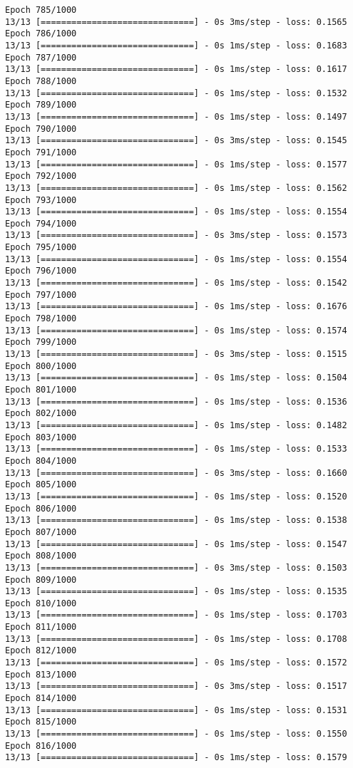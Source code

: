 \documentclass[11pt]{article}
\begin{document}
\begin{Verbatim}[commandchars=\\\{\}]
Epoch 785/1000
13/13 [==============================] - 0s 3ms/step - loss: 0.1565
Epoch 786/1000
13/13 [==============================] - 0s 1ms/step - loss: 0.1683
Epoch 787/1000
13/13 [==============================] - 0s 1ms/step - loss: 0.1617
Epoch 788/1000
13/13 [==============================] - 0s 1ms/step - loss: 0.1532
Epoch 789/1000
13/13 [==============================] - 0s 1ms/step - loss: 0.1497
Epoch 790/1000
13/13 [==============================] - 0s 3ms/step - loss: 0.1545
Epoch 791/1000
13/13 [==============================] - 0s 1ms/step - loss: 0.1577
Epoch 792/1000
13/13 [==============================] - 0s 1ms/step - loss: 0.1562
Epoch 793/1000
13/13 [==============================] - 0s 1ms/step - loss: 0.1554
Epoch 794/1000
13/13 [==============================] - 0s 3ms/step - loss: 0.1573
Epoch 795/1000
13/13 [==============================] - 0s 1ms/step - loss: 0.1554
Epoch 796/1000
13/13 [==============================] - 0s 1ms/step - loss: 0.1542
Epoch 797/1000
13/13 [==============================] - 0s 1ms/step - loss: 0.1676
Epoch 798/1000
13/13 [==============================] - 0s 1ms/step - loss: 0.1574
Epoch 799/1000
13/13 [==============================] - 0s 3ms/step - loss: 0.1515
Epoch 800/1000
13/13 [==============================] - 0s 1ms/step - loss: 0.1504
Epoch 801/1000
13/13 [==============================] - 0s 1ms/step - loss: 0.1536
Epoch 802/1000
13/13 [==============================] - 0s 1ms/step - loss: 0.1482
Epoch 803/1000
13/13 [==============================] - 0s 1ms/step - loss: 0.1533
Epoch 804/1000
13/13 [==============================] - 0s 3ms/step - loss: 0.1660
Epoch 805/1000
13/13 [==============================] - 0s 1ms/step - loss: 0.1520
Epoch 806/1000
13/13 [==============================] - 0s 1ms/step - loss: 0.1538
Epoch 807/1000
13/13 [==============================] - 0s 1ms/step - loss: 0.1547
Epoch 808/1000
13/13 [==============================] - 0s 3ms/step - loss: 0.1503
Epoch 809/1000
13/13 [==============================] - 0s 1ms/step - loss: 0.1535
Epoch 810/1000
13/13 [==============================] - 0s 1ms/step - loss: 0.1703
Epoch 811/1000
13/13 [==============================] - 0s 1ms/step - loss: 0.1708
Epoch 812/1000
13/13 [==============================] - 0s 1ms/step - loss: 0.1572
Epoch 813/1000
13/13 [==============================] - 0s 3ms/step - loss: 0.1517
Epoch 814/1000
13/13 [==============================] - 0s 1ms/step - loss: 0.1531
Epoch 815/1000
13/13 [==============================] - 0s 1ms/step - loss: 0.1550
Epoch 816/1000
13/13 [==============================] - 0s 1ms/step - loss: 0.1579

\end{Verbatim}
\end{document}
